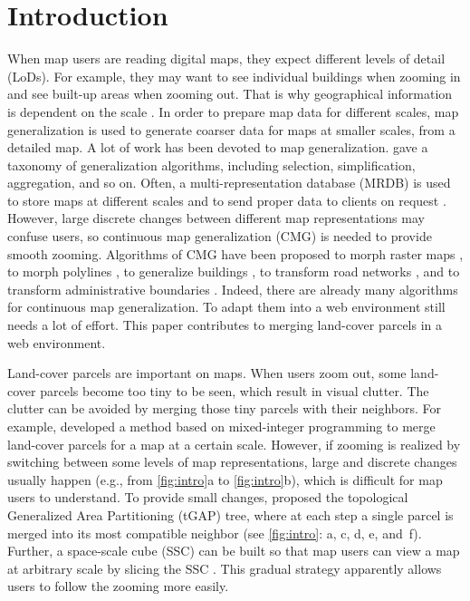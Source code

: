 \documentclass[ijgi,article,submit,moreauthors,pdftex]{Definitions/mdpi}
\begin{document}



\section{Introduction}

When map users are reading digital maps,
they expect different levels of detail (LoDs).
For example, they may want to see individual buildings when zooming in
and see built-up areas when zooming out.
That is why geographical information is dependent on the scale
\citep{Muller1995Generalization,Weibel1997}. 
In order to prepare map data for different scales,
map generalization is used to generate coarser data 
for maps at smaller scales,
from a detailed map.
A lot of work has been devoted to map generalization.
\citet{Mackaness2017Generalization} gave a taxonomy of 
generalization algorithms, 
including selection, simplification, aggregation, and so on.
Often, a multi-representation database (MRDB) is used to store
maps at different scales and to send proper data to clients on request
\citep[\eg][]{Hampe2004multiple}.
However, large discrete changes between different map representations
may confuse users,
so continuous map generalization (CMG) is needed to
provide smooth zooming.
Algorithms of CMG have been proposed 
to morph raster maps
\citep[\eg][]{Pantazis2009a,Pantazis2009b}, 
to morph polylines
\citep[\eg][]{Noellenburg2008,Peng2013LSA,Deng2015,Li2017Annealing},
to generalize buildings
\citep[\eg][]{Li2017_Building,Peng2017Building,Touya2017Progressive},
to transform road networks
\citep[\eg][]{Suba2016Road,Chimani2014Eat},
and to transform administrative boundaries
\citep[\eg][]{Peng2016Admin}.
Indeed, there are already many algorithms 
for continuous map generalization.
To adapt them into a web environment still needs a lot of effort.
This paper contributes to merging land-cover parcels 
in a web environment. 


Land-cover parcels are important on maps. 
When users zoom out,
some land-cover parcels become too tiny to be seen,
which result in visual clutter.
The clutter can be avoided by merging those tiny parcels 
with their neighbors.
For example, \citet{haunert2008f} developed a method based on
mixed-integer programming to merge land-cover parcels
for a map at a certain scale.
However, if zooming is realized by switching between
some levels of map representations, 
large and discrete changes usually happen
(e.g., from \fig\ref{fig:intro}a to \fig\ref{fig:intro}b), 
which is difficult for map users to understand.
To provide small changes, 
\citet{vanOosterom2005} proposed 
the topological Generalized Area Partitioning (tGAP) tree,
where at each step a single parcel is merged into
its most compatible neighbor 
(see \fig\ref{fig:intro}: a, c, d, e, and~f).
Further, a space-scale cube (SSC) can be built so that 
map users can view a map at arbitrary scale by slicing the SSC
\citep[see][]{Meijers2020Web}.
This gradual strategy apparently allows users 
to follow the zooming more easily.
\end{document}
